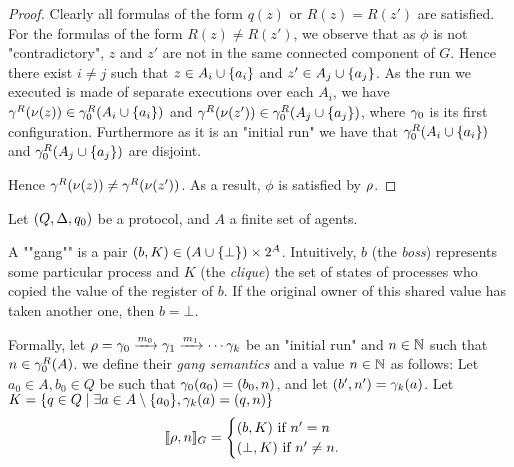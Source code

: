 \begin{proof}
	Clearly all formulas of the form $q(z)$ or $R(z) = R(z')$ are satisfied.
	For the formulas of the form $R(z) \neq R(z')$, we observe that as $\phi$ is not "contradictory", $z$ and $z'$ are not in the same connected component of $G$. 
	Hence there exist $i \neq j$ such that $z \in A_i\cup \{a_i\}$ and $z' \in A_j\cup \{a_j\}$. As the run we executed is made of separate executions over each $A_i$, we have $\gamma^R(\nu(z)) \in \gamma_0^R(A_i\cup\{a_i\})$ and $\gamma^R(\nu(z')) \in \gamma_0^R(A_j\cup\{a_j\})$, where $\gamma_0$ is its first configuration. Furthermore as it is an "initial run" we have that $\gamma_0^R(A_i\cup\{a_i\})$ and $\gamma_0^R(A_j\cup\{a_j\})$ are disjoint.
	
	Hence $\gamma^R(\nu(z)) \neq \gamma^R(\nu(z'))$. As a result, $\phi$ is satisfied by $\rho$.
\end{proof}



\begin{definition}
	Let $(Q,\Delta, q_0)$ be a protocol, and $A$ a finite set of agents.
	
	A ""gang"" is a pair $(b, K) \in (A \cup \{\bot\}) \times 2^{A}$.
	Intuitively, $b$ (the \emph{boss}) represents some particular process and $K$ (the \emph{clique}) the set of states of processes who copied the value of the register of $b$. If the original owner of this shared value has taken another one, then $b = \bot$.
	
	Formally, let $\rho = \gamma_0 \xrightarrow{m_0} \gamma_1 \xrightarrow{m_1} \cdots \gamma_k$ be an "initial run" and $n \in \mathbb{N}$ such that $n \in \gamma_0^R(A)$.
	we define their \emph{gang semantics} and a value $n \in \mathbb{N}$ as follows:
	Let $a_0 \in A, b_0 \in Q$ be such that $\gamma_0(a_0) = (b_0,n)$, and let $(b', n') = \gamma_k(a)$.
	Let $K = \{q \in Q \mid \exists a \in A\setminus \{a_0\}, \gamma_k(a) = (q,n)\}$
	\[
	[\![\rho,n]\!]_G= 
	\begin{cases}
		(b,K) \text{ if } n'=n\\
		(\bot, K) \text{ if } n'\neq n.
	\end{cases} 
	\]
\end{definition} 


